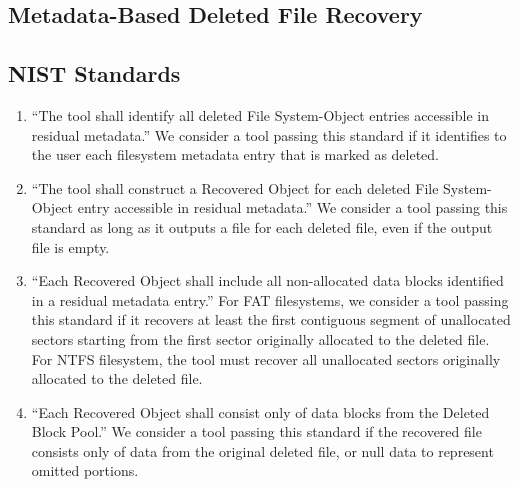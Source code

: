 \subsection{Metadata-Based Deleted File Recovery}

\subsection{NIST Standards}
\begin{enumerate}
 \item ``The tool shall identify all deleted File System-Object entries accessible in residual metadata.''\cite{meta:dfr:standards}
 We consider a tool passing this standard if it identifies to the user each filesystem metadata entry that is marked as deleted.
 \item ``The tool shall construct a Recovered Object for each deleted File System-Object entry accessible in residual metadata.''\cite{meta:dfr:standards}
 We consider a tool passing this standard as long as it outputs a file for each deleted file, even if the output file is empty.
 \item ``Each Recovered Object shall include all non-allocated data blocks identified in a residual metadata entry.''\cite{meta:dfr:standards}
 For FAT filesystems, we consider a tool passing this standard if it recovers at least the first contiguous segment of unallocated sectors starting from the first sector originally allocated to the deleted file. For NTFS filesystem, the tool must recover all unallocated sectors originally allocated to the deleted file.
 \item ``Each Recovered Object shall consist only of data blocks from the Deleted Block Pool.''\cite{meta:dfr:standards}
 We consider a tool passing this standard if the recovered file consists only of data from the original deleted file, or null data to represent omitted portions.
\end{enumerate}


